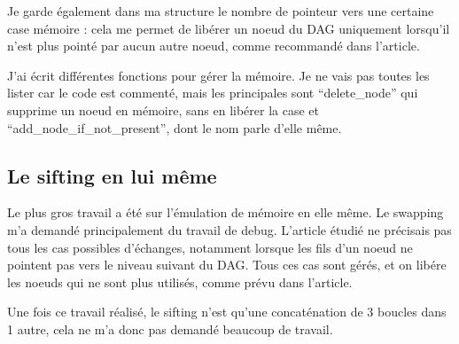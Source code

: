 \documentclass[a4paper,10pt]{article}
\begin{document}
Je garde également dans ma structure le nombre de pointeur vers une certaine case mémoire : cela me permet de libérer un noeud du DAG uniquement lorsqu'il n'est plus pointé par aucun autre
noeud, comme recommandé dans l'article.

J'ai écrit différentes fonctions pour gérer la mémoire. Je ne vais pas toutes les lister car le code est commenté, mais les principales sont ``delete\_node'' qui supprime un noeud en mémoire, sans en libérer la
case et ``add\_node\_if\_not\_present'', dont le nom parle d'elle même.

\subsection{Le sifting en lui même}
Le plus gros travail a été sur l'émulation de mémoire en elle même. Le swapping m'a demandé principalement du travail de debug. L'article étudié ne précisais pas tous les cas possibles d'échanges, 
notamment lorsque les fils d'un noeud ne pointent pas vers le niveau suivant du DAG. Tous ces cas sont gérés, et on libére les noeuds qui ne sont plus utilisés, comme prévu dans l'article.

Une fois ce travail réalisé, le sifting n'est qu'une concaténation de 3 boucles dans 1 autre, cela ne m'a donc pas demandé beaucoup de travail.
\end{document}

